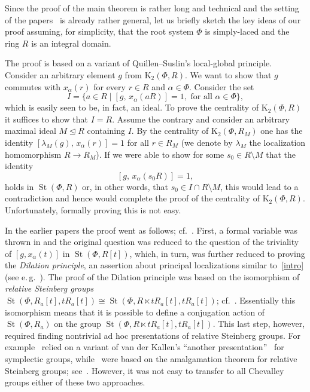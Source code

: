 \documentclass[oneside, 11pt]{amsart}
\numberwithin{equation}{section}
\theoremstyle{definition}
\theoremstyle{remark}
\DeclareMathOperator\St{St}
\begin{document}
Since the proof of the main theorem is rather long and technical and the setting of the papers~\cite{Vor1,Vor2} is already rather general, let us briefly sketch the key ideas of our proof assuming, for simplicity, that the root system $\Phi$ is simply-laced and the ring $R$ is an integral domain.

The proof is based on a variant of Quillen--Suslin's local-global principle.
Consider an arbitrary element $g$ from $\mathrm K_{2}(\Phi, R)$. We want to show that $g$ commutes with $x_{\alpha}(r)$ for every $r\in R$ and $\alpha\in\Phi$.
Consider the set \[I=\{a\in R\mid [g,\,x_{\alpha}(aR)]=1,\text{ for all }\alpha\in\Phi\},\] which is easily seen to be, in fact, an ideal.
To prove the centrality of $\mathrm{K}_{2}(\Phi, R)$ it suffices to show that $I=R$.
Assume the contrary and consider an arbitrary maximal ideal $M \trianglelefteq R$ containing $I$. 
By the centrality of $\mathrm K_{2}(\Phi, R_M)$ one has the identity $[\lambda_{M}(g),\,x_{\alpha}(r)]=1$ for all $r\in R_{M}$ (we denote by $\lambda_M$ the localization homomorphism $R \to R_M$). 
If we were able to show for some $s_0\in R\setminus M$ that the identity \begin{equation} \label{intro} [g,\,x_{\alpha}(s_0R)]=1, \end{equation} holds in $\St(\Phi, R)$ or, in other words, that $s_0\in I\cap R\setminus M$, this would lead to a contradiction and hence would complete the proof of the centrality of $\mathrm K_{2}(\Phi, R)$. Unfortunately, formally proving this is not easy. 

In the earlier papers the proof went as follows; cf.~\cite{Tul,Sin,LavSin,Lavlgp}.
First, a formal variable was thrown in and the original question was reduced to the question of the triviality of $[g, x_{\alpha}(t)]$ in $\St(\Phi, R[t])$, which, in turn, was further reduced to proving the {\it Dilation principle}, an assertion about principal localizations similar to~\eqref{intro} (see e.\,g.~\cite[Lemma~15]{Sin}). The proof of the Dilation principle was based on the isomorphism of {\it relative Steinberg groups} $\St(\Phi, R_a[t], tR_a[t]) \cong \St(\Phi, R \ltimes tR_a[t], tR_a[t])$; cf.~\cite[Remark~3.12]{Sin}. Essentially this isomorphism means that it is possible to define a conjugation action of $\St(\Phi, R_a)$ on the group $\St(\Phi, R\ltimes tR_a[t], tR_a[t])$.
This last step, however, required finding nontrivial ad hoc presentations of relative Steinberg groups.
For example~\cite{Lavlgp} relied on a variant of van der Kallen's ``another presentation''~\cite{vdK} for symplectic groups, while~\cite{Sin, LavSin} were based on the amalgamation theorem for relative Steinberg groups; see~\cite[Theorem~9]{Sin}. However, it was not easy to transfer to all Chevalley groups either of these two approaches.
\end{document}
